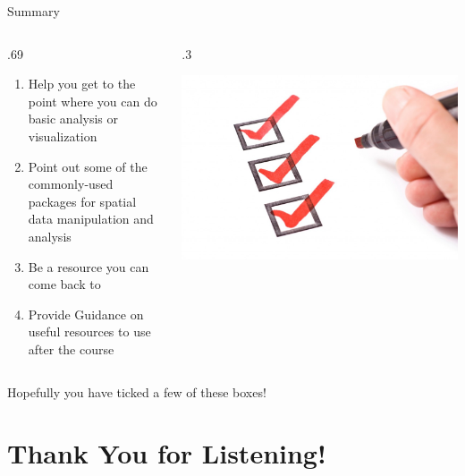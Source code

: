 \documentclass[10pt,ignorenonframetext,]{beamer}
\providecommand{\tightlist}{%
  \setlength{\itemsep}{0pt}\setlength{\parskip}{0pt}}
\def\begincols{\begin{columns}}
\def\begincol{\begin{column}}
\def\endcol{\end{column}}
\def\endcols{\end{columns}}
\begin{document}
\begin{frame}{Summary}

\begincols
\begincol{.69\textwidth}

\begin{enumerate}
\def\labelenumi{\arabic{enumi}.}
\tightlist
\item
  Help you get to the point where you can do basic analysis or
  visualization
\item
  Point out some of the commonly-used packages for spatial data
  manipulation and analysis
\item
  Be a resource you can come back to
\item
  Provide Guidance on useful resources to use after the course
\end{enumerate}

\endcol
\begincol{.3\textwidth}

\begin{center}\includegraphics[width=1\linewidth]{../images/Goals} \end{center}

\endcol
\endcols

\begin{exampleblock}{}
Hopefully you have ticked a few of these boxes!
\end{exampleblock}

\end{frame}

\section{Thank You for Listening!}\label{thank-you-for-listening}
\end{document}
